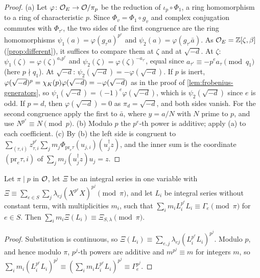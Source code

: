 \begin{proof}
(a) Let $\varphi\colon\mathcal{O}_E\to\mathcal{O}/\pi_p$ be the reduction of $\iota_p\circ\Phi_1$, a ring homomorphism to
a ring of characteristic $p$. Since $\Phi_v=\Phi_1\circ g_v$ and complex conjugation commutes with
$\Phi_{\tau'}$, the two sides of the first congruence are the ring homomorphisms
$\psi_1(a)=\varphi(g_\tau a)^{p^e}$ and $\psi_2(a)=\varphi(g_{\tau'}\bar a)$. As $\mathcal{O}_E=\mathbb{Z}[\zeta,\beta]$
(\cref{prop:different}), it suffices to compare them at $\zeta$ and at $\sqrt{-d}$. At $\zeta$:
$\psi_1(\zeta)=\varphi(\zeta)^{a_\tau p^e}$ and $\psi_2(\zeta)=\varphi(\zeta)^{-a_{\tau'}}$, equal since
$a_{\tau'}\equiv-p^ea_\tau\pmod{q_1}$ (here $p\nmid q_1$). At $\sqrt{-d}$: $\psi_2(\sqrt{-d})=
-\varphi(\sqrt{-d})$. If $p$ is inert, $\varphi(\sqrt{-d})^p=\chi_K(p)\varphi(\sqrt{-d})=-\varphi(\sqrt{-d})$
as in the proof of \cref{lem:frobenius-generators}, so $\psi_1(\sqrt{-d})=(-1)^e\varphi(\sqrt{-d})$,
which is $\psi_2(\sqrt{-d})$ since $e$ is odd. If $p=d$, then $\varphi(\sqrt{-d})=0$ as
$\pi_d=\sqrt{-d}$, and both sides vanish. For the second congruence apply the first to $\bar a$, where
$y=a/N$ with $N$ prime to $p$, and use $N^{p^e}\equiv N\pmod p$.
(b) Modulo $p$ the $p^e$-th power is additive; apply (a) to each coefficient.
(c) By (b) the left side is congruent to
$\sum_{(\tau,i)}z_{\tau,i}^{p^e}\sum_jm_j\Phi_{\mathrm{pr}_e\tau}(u_{j,i})(u_j^\dagger z)$, and the inner
sum is the coordinate $(\mathrm{pr}_e\tau,i)$ of $\sum_jm_j(u_j^\dagger z)u_j=z$.
\end{proof}

\begin{lemma}\label{lem:sum-of-exponents}
Let $\pi\mid p$ in $\mathcal{O}$, let $\Xi$ be an integral series in one variable with
$\Xi\equiv\sum_{e\in S}\sum_j\lambda_{ej}(X^{p^e}X)^{p^j}\pmod\pi$, and let $L_i$ be integral series
without constant term, with multiplicities $m_i$, such that
$\sum_im_iL_i^{p^e}L_i\equiv\Gamma_e\pmod\pi$ for $e\in S$. Then
$\sum_im_i\Xi(L_i)\equiv\Xi_{S,\lambda}\pmod\pi$.
\end{lemma}

\begin{proof}
Substitution is continuous, so $\Xi(L_i)\equiv\sum_{e,j}\lambda_{ej}(L_i^{p^e}L_i)^{p^j}$. Modulo $p$,
and hence modulo $\pi$, $p^j$-th powers are additive and $m^{p^j}\equiv m$ for integers $m$, so
$\sum_im_i(L_i^{p^e}L_i)^{p^j}\equiv(\sum_im_iL_i^{p^e}L_i)^{p^j}\equiv\Gamma_e^{p^j}$.
\end{proof}

